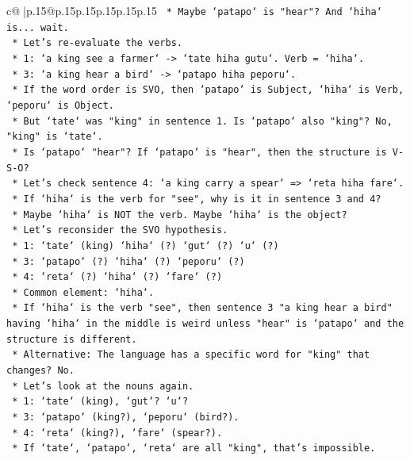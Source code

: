 \documentclass{article}
\begin{document}
{\begin{supertabular}{c@{$\;$}|p{.15\linewidth}@{}p{.15\linewidth}p{.15\linewidth}p{.15\linewidth}p{.15\linewidth}p{.15\linewidth}}
{{{\texttt{        *   Maybe `patapo` is "hear"? And `hiha` is... wait.} \\
\texttt{        *   Let's re{-}evaluate the verbs.} \\
\texttt{        *   1: `a king see a farmer` {-}> `tate hiha gutu`. Verb = `hiha`.} \\
\texttt{        *   3: `a king hear a bird` {-}> `patapo hiha peporu`.} \\
\texttt{        *   If the word order is SVO, then `patapo` is Subject, `hiha` is Verb, `peporu` is Object.} \\
\texttt{        *   But `tate` was "king" in sentence 1. Is `patapo` also "king"? No, "king" is `tate`.} \\
\texttt{        *   Is `patapo` "hear"? If `patapo` is "hear", then the structure is V{-}S{-}O?} \\
\texttt{        *   Let's check sentence 4: `a king carry a spear` => `reta hiha fare`.} \\
\texttt{        *   If `hiha` is the verb for "see", why is it in sentence 3 and 4?} \\
\texttt{        *   Maybe `hiha` is NOT the verb. Maybe `hiha` is the object?} \\
\texttt{        *   Let's reconsider the SVO hypothesis.} \\
\texttt{        *   1: `tate` (king) `hiha` (?) `gut` (?) `u` (?)} \\
\texttt{        *   3: `patapo` (?) `hiha` (?) `peporu` (?)} \\
\texttt{        *   4: `reta` (?) `hiha` (?) `fare` (?)} \\
\texttt{        *   Common element: `hiha`.} \\
\texttt{        *   If `hiha` is the verb "see", then sentence 3 "a king hear a bird" having `hiha` in the middle is weird unless "hear" is `patapo` and the structure is different.} \\
\texttt{        *   Alternative: The language has a specific word for "king" that changes? No.} \\
\texttt{        *   Let's look at the nouns again.} \\
\texttt{        *   1: `tate` (king), `gut`? `u`?} \\
\texttt{        *   3: `patapo` (king?), `peporu` (bird?).} \\
\texttt{        *   4: `reta` (king?), `fare` (spear?).} \\
\texttt{        *   If `tate`, `patapo`, `reta` are all "king", that's impossible.} \\
}}}
\end{supertabular}}
\end{document}
